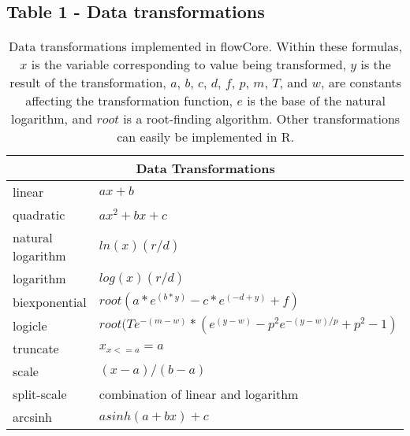 \documentclass[10pt]{bmc_article}
\newcommand{\Rpackage}[1]{{\textsf{#1}}}
\newenvironment{bmcformat}{\begin{raggedright}\baselineskip20pt\sloppy\setboolean{publ}{false}}{\end{raggedright}\baselineskip20pt\sloppy}
\begin{document}
\begin{bmcformat}
  \subsection*{Table 1 - Data transformations}
    \begin{table}[ht]
      \caption{\label{table1} Data transformations implemented in \Rpackage{flowCore}. Within these formulas, $x$ is the variable
        corresponding to value being transformed, $y$ is the result of the
        transformation, $a$, $b$, $c$, $d$, $f$, $p$, $m$, $T$, and $w$, are
        constants affecting the transformation function, $e$ is the base of
        the natural logarithm, and $root$ is a root-finding algorithm. Other transformations can easily be implemented in R.}
      \begin{center}
        \begin{tabular}{|l|l|}
          \hline
          \multicolumn{2}{|c|}{Data Transformations} \\
          \hline
          linear & $ax + b$ \\
          quadratic & $ax^2 + bx + c$ \\
          natural logarithm & $ln(x)(r/d)$ \\
          logarithm & $log(x)(r/d)$ \\
          biexponential & $root(a*e^{(b*y)}-c*e^{(-d+y)}+f)$ \\
          logicle& $root(Te^{-(m-w)}*(e^{(y-w)}-p^2e^{-(y-w)/p}+p^2-1)$ \\
          truncate & $x_{x<=a} = a$ \\
          scale & $(x-a)/(b-a)$ \\
          split-scale & combination of linear and logarithm \\
          arcsinh & $asinh(a + bx)+c$ \\
          \hline
        \end{tabular}
      \end{center}
    \end{table}


\end{bmcformat}
\end{document}
